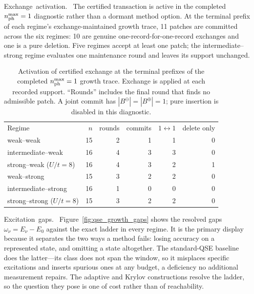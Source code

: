 \documentclass[
  reprint,
  amsmath,
  amssymb,
  aps,
  pra,
  nofootinbib,
  superscriptaddress,
  floatfix
]{revtex4-2}
\newcommand{\tentative}[1]{\textcolor{red!70!black}{#1}}
\newcommand{\structlabel}[1]{\noindent\mbox{\tentative{#1.}}~}
\begin{document}
\structlabel{Exchange activation}
The certified transaction is active in the completed $n_{\rm ph}^{\max}=1$ diagnostic rather than a dormant method option.  At the terminal prefix of each regime's exchange-maintained growth trace, 11 patches are committed across the six regimes: 10 are genuine one-record-for-one-record exchanges and one is a pure deletion.  Five regimes accept at least one patch; the intermediate--strong regime evaluates one maintenance round and leaves its support unchanged.

\begin{table}[t]
\caption{Activation of certified exchange at the terminal prefixes of the completed $n_{\rm ph}^{\max}=1$ growth trace.  Exchange is applied at each recorded support.  ``Rounds'' includes the final round that finds no admissible patch.  A joint commit has $|B^{\ominus}|=|B^{\oplus}|=1$; pure insertion is disabled in this diagnostic.}
\label{tab:qse_exchange_activation}
\scriptsize
\begin{ruledtabular}
\begin{tabular}{lrrrrr}
Regime & $n$ & rounds & commits & $1\leftrightarrow 1$ & delete only \\
\colrule
weak--weak & 15 & 2 & 1 & 1 & 0 \\
intermediate--weak & 16 & 4 & 3 & 3 & 0 \\
strong--weak ($U/t=8$) & 16 & 4 & 3 & 2 & 1 \\
weak--strong & 15 & 3 & 2 & 2 & 0 \\
intermediate--strong & 16 & 1 & 0 & 0 & 0 \\
strong--strong ($U/t=8$) & 15 & 3 & 2 & 2 & 0 \\
\end{tabular}
\end{ruledtabular}
\end{table}

\structlabel{Excitation gaps}
Figure~\ref{fig:qse_growth_gaps} shows the resolved gaps $\omega_\nu=E_\nu-E_0$ against the exact ladder in every regime.  It is the primary display because it separates the two ways a method fails: losing accuracy on a represented state, and omitting a state altogether.  The standard-QSE baseline does the latter---its class does not span the window, so it misplaces specific excitations and inserts spurious ones at any budget, a deficiency no additional measurement repairs.  The adaptive and Krylov constructions resolve the ladder, so the question they pose is one of cost rather than of reachability.
\end{document}
